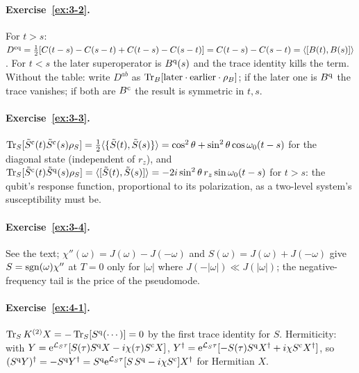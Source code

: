 \paragraph{Exercise~\ref{ex:3-2}.}
For $t>s$: $D^{\mathrm{c}\mathrm{q}}=\tfrac12[C(t-s)-C(s-t)+C(t-s)-C(s-t)]=C(t-s)-C(s-t)=\langle[B(t),B(s)]\rangle$.
For $t<s$ the later superoperator is $B^{\mathrm{q}}(s)$ and the trace identity kills the term.
Without the table: write $D^{ab}$ as $\operatorname{Tr}_B[\text{later}\cdot\text{earlier}\cdot\rho_{B}]$; if the later one is $B^{\mathrm{q}}$ the trace vanishes; if both are $B^{\mathrm{c}}$ the result is symmetric in $t,s$.

\paragraph{Exercise~\ref{ex:3-3}.}
$\operatorname{Tr}_S[\tilde S^{\mathrm{c}}(t)\tilde S^{\mathrm{c}}(s)\rho_S]=\tfrac12\langle\{\tilde S(t),\tilde S(s)\}\rangle=\cos^2\theta+\sin^2\theta\cos\omega_0(t-s)$ for the diagonal state (independent of $r_z$), and $\operatorname{Tr}_S[\tilde S^{\mathrm{c}}(t)\tilde S^{\mathrm{q}}(s)\rho_S]=\langle[\tilde S(t),\tilde S(s)]\rangle=-2i\sin^2\theta\,r_z\sin\omega_0(t-s)$ for $t>s$: the qubit's response function, proportional to its polarization, as a two-level system's susceptibility must be.

\paragraph{Exercise~\ref{ex:3-4}.}
See the text; $\chi''(\omega)=J(\omega)-J(-\omega)$ and $S(\omega)=J(\omega)+J(-\omega)$ give $S=\operatorname{sgn}(\omega)\chi''$ at $T=0$ only for $|\omega|$ where $J(-|\omega|)\ll J(|\omega|)$; the negative-frequency tail is the price of the pseudomode.

\paragraph{Exercise~\ref{ex:4-1}.}
$\operatorname{Tr}_SK^{(2)}X=-\operatorname{Tr}_S[S^{\mathrm{q}}(\cdots)]=0$ by the first trace identity for $S$.
Hermiticity: with $Y=\mathrm{e}^{\mathcal{L}_S\tau}[S(\tau)S^{\mathrm{q}} X-i\chi(\tau)S^{\mathrm{c}} X]$, $Y^\dagger=\mathrm{e}^{\mathcal{L}_S\tau}[-S(\tau)S^{\mathrm{q}} X^\dagger+i\chi S^{\mathrm{c}} X^\dagger]$, so $(S^{\mathrm{q}} Y)^\dagger=-S^{\mathrm{q}} Y^\dagger=S^{\mathrm{q}}\mathrm{e}^{\mathcal{L}_S\tau}[S\,S^{\mathrm{q}}-i\chi S^{\mathrm{c}}]X^\dagger$ for Hermitian $X$.

